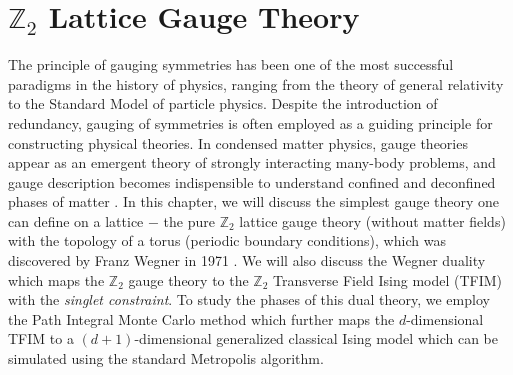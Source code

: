 \documentclass[../thesis_main.tex]{subfiles}
\begin{document}
\chapter{$\mathbb{Z}_2$ Lattice Gauge Theory}
The principle of gauging symmetries has been one of the most successful paradigms in the history of physics, ranging from the theory of general relativity to the Standard Model of particle physics. Despite the introduction of redundancy, gauging of symmetries is often employed as a guiding principle for constructing physical theories. In condensed matter physics, gauge theories appear as an emergent theory of strongly interacting many-body problems, and gauge description becomes indispensible to understand confined and deconfined phases of matter \cite{Sergej,Mathur_et_al}. In this chapter, we will discuss the simplest gauge theory one can define on a lattice $-$ the pure $\mathbb{Z}_2$ lattice gauge theory (without matter fields) with the topology of a torus (periodic boundary conditions), which was discovered by Franz Wegner in 1971 \cite{wegner2014duality}. We will also discuss the Wegner duality which maps the $\mathbb{Z}_2$ gauge theory to the $\mathbb{Z}_2$ Transverse Field Ising model (TFIM) with the \textit{singlet constraint}. To study the phases of this dual theory, we employ the Path Integral Monte Carlo method which further maps the $d$-dimensional TFIM to a $(d+1)$-dimensional generalized classical Ising model which can be simulated using the standard Metropolis algorithm.
\end{document}
